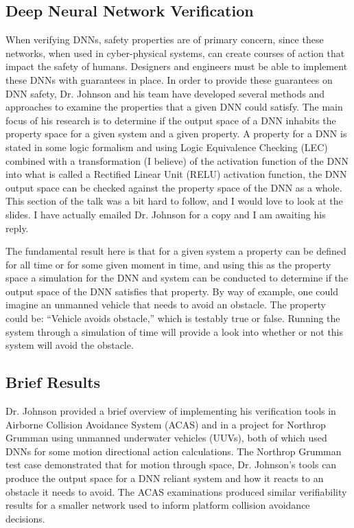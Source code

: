 \documentclass[10pt, journal]{IEEEtran}
\begin{document}
\subsection{Deep Neural Network Verification}
When verifying DNNs, safety properties are of primary concern, since these networks, when used in cyber-physical systems, can create courses of action that impact the safety of humans. Designers and engineers must be able to implement these DNNs with guarantees in place. In order to provide these guarantees on DNN safety, Dr. Johnson and his team have developed several methods and approaches to examine the properties that a given DNN could satisfy. The main focus of his research is to determine if the output space of a DNN inhabits the property space for a given system and a given property. A property for a DNN is stated in some logic formalism and using Logic Equivalence Checking (LEC) combined with a transformation (I believe) of the activation function of the DNN into what is called a Rectified Linear Unit (RELU) activation function, the DNN output space can be checked against the property space of the DNN as a whole. This section of the talk was a bit hard to follow, and I would love to look at the slides. I have actually emailed Dr. Johnson for a copy and I am awaiting his reply.

The fundamental result here is that for a given system a property can be defined for all time or for some given moment in time, and using this as the property space a simulation for the DNN and system can be conducted to determine if the output space of the DNN satisfies that property. By way of example, one could imagine an unmanned vehicle that needs to avoid an obstacle. The property could be: ``Vehicle avoids obstacle,'' which is testably true or false. Running the system through a simulation of time will provide a look into whether or not this system will avoid the obstacle.

\subsection{Brief Results}
Dr. Johnson provided a brief overview of implementing his verification tools in Airborne Collision Avoidance System (ACAS) and in a project for Northrop Grumman using unmanned underwater vehicles (UUVs), both of which used DNNs for some motion directional action calculations. The Northrop Grumman test case demonstrated that for motion through space, Dr. Johnson's tools can produce the output space for a DNN reliant system and how it reacts to an obstacle it needs to avoid. The ACAS examinations  produced similar verifiability results for a smaller network used to inform platform collision avoidance decisions.
\end{document}
